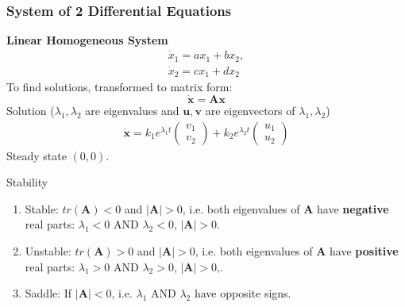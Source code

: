 \documentclass[
10pt, %
]{beamer}
\def\A{\mathbf A}
\begin{document}
\begin{frame}
\frametitle{System of 2 Differential Equations}
\textbf{Linear Homogeneous System}
	\begin{align*}
		\dot{x}_1 = a x_1 + b x_2, \\
		\dot{x}_2 = c x_1 + d x_2
	\end{align*}
To find solutions, transformed to matrix form:
\[
\dot{\mathbf{x}} = \mathbf{A} \mathbf{x}
\]
Solution ($\lambda_1,\lambda_2$ are eigenvalues and $\mathbf{u},\mathbf{v}$ are eigenvectors of $\lambda_1,\lambda_2$)
\begin{align*}
	\dot{\mathbf{x}} = k_1 e^{\lambda_1 t} \begin{pmatrix}
			v_1 \\ v_2
		\end{pmatrix} + k_2 e^{\lambda_2 t} \begin{pmatrix}
			u_1 \\ u_2 \end{pmatrix}
	\end{align*}
Steady state $(0,0)$.

Stability
	\begin{enumerate}
		\item Stable: $tr(\A) < 0$ and $|\A| > 0$, i.e. both eigenvalues of $\A$ have \textbf{negative} real parts: $\lambda_1 < 0$ AND $\lambda_2 < 0$, $|\A| > 0$.
		\item Unstable: $tr(\A) > 0$ and $|\A| > 0$, i.e. both eigenvalues of $\A$ have \textbf{positive} real parts: $\lambda_1 > 0$ AND $\lambda_2 > 0$, $|\A| > 0$,.
		\item Saddle: If $|\A| < 0$, i.e. $\lambda_1$ AND $\lambda_2$ have opposite signs.
	\end{enumerate}
\end{frame}
\end{document}
